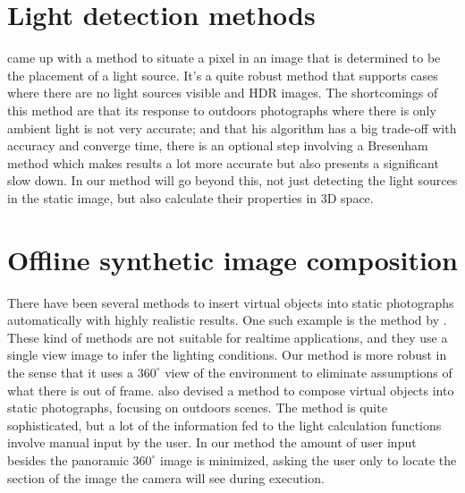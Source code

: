\section{Light detection methods}
\cite{Laskowski2007} came up with a method to situate a pixel in an image that is determined to be the placement of a light source. It's a quite robust method that supports cases where there are no light sources visible and HDR images. The shortcomings of this method are that its response to outdoors photographs where there is only ambient light is not very accurate; and that his algorithm has a big trade-off with accuracy and converge time, there is an optional step involving a Bresenham method which makes results a lot more accurate but also presents a significant slow down. In our method will go beyond this, not just detecting the light sources in the static image, but also calculate their properties in 3D space. \newline
\section{Offline synthetic image composition} 
There have been several methods to insert virtual objects into static photographs automatically with highly realistic results. One such example is the method by \cite{karsh2014}. These kind of methods are not suitable for realtime applications, and they use a single view image to infer the lighting conditions. Our method is more robust in the sense that it uses a $360^{\circ}$ view of the environment to eliminate assumptions of what there is out of frame.\newline
\cite{xing2013} also devised a method to compose virtual objects into static photographs, focusing on outdoors scenes. The method is quite sophisticated, but a lot of the information fed to the light calculation functions involve manual input by the user. In our method the amount of user input besides the panoramic $360^{\circ}$ image is minimized, asking the user only to locate the section of the image the camera will see during execution.\newline
